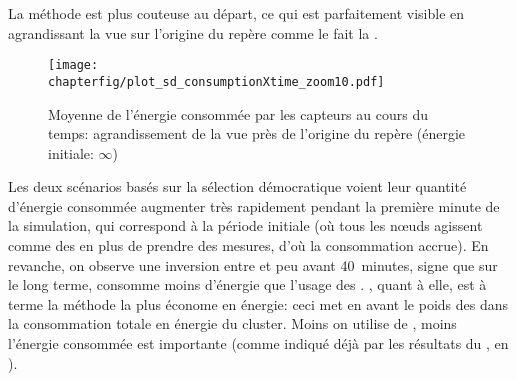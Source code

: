 La méthode \iddemx est plus couteuse au départ, ce qui est parfaitement visible en agrandissant la vue sur l'origine du repère comme le fait la .
\begin{figure}[p]
    \centering
    \texttt{[image: \\chapterfig/plot\_sd\_consumptionXtime\_zoom10.pdf]}
    \caption[Moyenne de l'énergie consommée par les capteurs au cours du temps: agrandissement de la vue près de l'origine du repère]{Moyenne de l'énergie consommée par les capteurs au cours du temps: agrandissement de la vue près de l'origine du repère (énergie initiale: $\infty$)}\label{sd:fig:cons-inf-zoom}
\end{figure}
Les deux scénarios basés sur la sélection démocratique voient leur quantité d'énergie consommée augmenter très rapidement pendant la première minute de la simulation, qui correspond à la période initiale (où tous les nœuds agissent comme des \cns en plus de prendre des mesures, d'où la consommation accrue).
En revanche, on observe une inversion entre \ideres et \iddemx peu avant 40~minutes, signe que sur le long terme, \iddemx consomme moins d'énergie que l'usage des \vns.
\iddems, quant à elle, est à terme la méthode la plus économe en énergie: ceci met en avant le poids des \cns dans la consommation totale en énergie du cluster.
Moins on utilise de \cns, moins l'énergie consommée est importante (comme indiqué déjà par les résultats du , en ).

